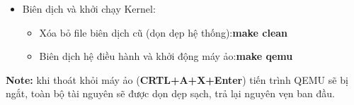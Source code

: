 \begin{itemize}
\begin{itemize}
        \item Lý do chọn vị trí can thiệp sau \textbf{devintr()}:\newline Nhằm tối ưu hóa 
         hiệu năng cốt lõi của kernel. Trong quá trình vận hành, các ngắt ngoại vi (đặc biệt là ngắt Timer) có tần xuất xảy ra cực cao. Bằng cách thiết lập luồng điều khiển ưu tiên xử lý và giải phóng các thiết bị ngắt này trước CPU tránh được hao phí khi thực hiện các phép toán kiểm tra ranh giới địa chỉ Guard Page lặp lại không cần thiết. Thuật toán chuẩn đoán phân luồng lỗi (mã 13 và 15) chỉ được kích hoạt khi hệ thống đã thực hiện xong các sự kiện phần cứng hợp lệ để đảm bảo tính trôi chảy và đáp ứng thời gian thực của hệ điều hành.
    \end{itemize}
    \item Biên dịch và khởi chạy Kernel:
    \begin{itemize}
        \item Xóa bỏ file biên dịch cũ (dọn dẹp hệ thống):\textbf{make clean}
        \item Biên dịch hệ điều hành và khởi động máy ảo:\textbf{make qemu}
    \end{itemize}
\end{itemize}
\textbf{Note:} khi thoát khỏi máy ảo (\textbf{CRTL+A+X+Enter}) tiến trình QEMU sẽ bị ngắt, toàn bộ tài nguyên sẽ được dọn dẹp sạch, trả lại nguyên vẹn ban đầu.